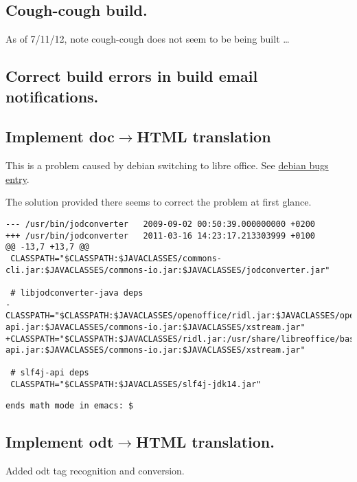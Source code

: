 \documentclass[12pt]{article}
\begin{document}
\subsection{Cough-cough build.}
As of 7/11/12, note cough-cough does not seem to be being built \ldots


\subsection{Correct build errors in build email notifications.}


\subsection{Implement doc$\rightarrow$HTML translation}

This is a problem caused by debian switching to libre office.  See
\href{http://bugs.debian.org/cgi-bin/bugreport.cgi?bug=618750}{debian
  bugs entry}.

The solution provided there seems to correct the problem at first glance.

\begin{verbatim}
--- /usr/bin/jodconverter	2009-09-02 00:50:39.000000000 +0200
+++ /usr/bin/jodconverter	2011-03-16 14:23:17.213303999 +0100
@@ -13,7 +13,7 @@
 CLASSPATH="$CLASSPATH:$JAVACLASSES/commons-cli.jar:$JAVACLASSES/commons-io.jar:$JAVACLASSES/jodconverter.jar"
 
 # libjodconverter-java deps
-CLASSPATH="$CLASSPATH:$JAVACLASSES/openoffice/ridl.jar:$JAVACLASSES/openoffice/unoil.jar:$JAVACLASSES/openoffice/juh.jar:$JAVACLASSES/slf4j-api.jar:$JAVACLASSES/commons-io.jar:$JAVACLASSES/xstream.jar"
+CLASSPATH="$CLASSPATH:$JAVACLASSES/ridl.jar:/usr/share/libreoffice/basis3.3/program/classes/unoil.jar:$JAVACLASSES/juh.jar:$JAVACLASSES/slf4j-api.jar:$JAVACLASSES/commons-io.jar:$JAVACLASSES/xstream.jar"
 
 # slf4j-api deps
 CLASSPATH="$CLASSPATH:$JAVACLASSES/slf4j-jdk14.jar"
\end{verbatim}
\begin{verbatim}
ends math mode in emacs: $
\end{verbatim}


\subsection{Implement odt$\rightarrow$HTML translation.}

Added odt tag recognition and conversion.
\end{document}
